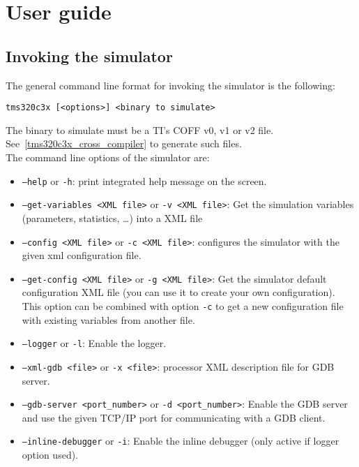 \section{User guide}

\subsection{Invoking the simulator}

The general command line format for invoking the simulator is the following:

\begin{verbatim}
tms320c3x [<options>] <binary to simulate>
\end{verbatim}

\noindent The binary to simulate must be a TI's COFF v0, v1 or v2 file. See~\ref{tms320c3x_cross_compiler} to generate such files.
\newline\\
\noindent The command line options of the simulator are:

\begin{itemize}
\item \texttt{--help} or \texttt{-h}: print integrated help message on the screen.
\item \texttt{--get-variables <XML file>} or \texttt{-v <XML file>}: Get the simulation variables (parameters, statistics, \ldots) into a XML file
\item \texttt{--config <XML file>} or \texttt{-c <XML file>}: configures the simulator with the given xml configuration file.
\item \texttt{--get-config <XML file>} or \texttt{-g <XML file>}: Get the simulator default configuration XML file (you can use it to create your own configuration). This option can be combined with option \texttt{-c} to get a new configuration file with existing variables from another file.
\item \texttt{--logger} or \texttt{-l}: Enable the logger.
\item \texttt{--xml-gdb <file>} or \texttt{-x <file>}: processor XML description file for GDB server.
\item \texttt{--gdb-server <port\_number>} or \texttt{-d <port\_number>}: Enable the GDB server and use the given TCP/IP port for communicating with a GDB client.
\item \texttt{--inline-debugger} or \texttt{-i}: Enable the inline debugger (only active if logger option used).
\end{itemize}

